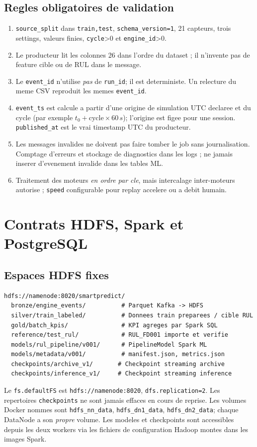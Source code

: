 \documentclass[10pt,a4paper]{article}
\newcommand{\code}[1]{{\small\ttfamily\nolinkurl{#1}}}
\begin{document}
\subsection{Regles obligatoires de validation}
\begin{enumerate}
\item \code{source_split} dans \code{train,test}, \code{schema_version=1}, 21 capteurs, trois settings, valeurs finies, \code{cycle}>0 et \code{engine_id}>0.
\item Le producteur lit les colonnes 26 dans l'ordre du dataset ; il n'invente pas de feature cible ou de RUL dans le message.
\item Le \code{event_id} n'utilise \emph{pas} de \code{run_id}; il est deterministe. Un relecture du meme CSV reproduit les memes \code{event_id}.
\item \code{event_ts} est calcule a partir d'une origine de simulation UTC declaree et du cycle (par exemple \(t_0+\mathrm{cycle}\times 60\,s\)); l'origine est figee pour une session. \code{published_at} est le vrai timestamp UTC du producteur.
\item Les messages invalides ne doivent pas faire tomber le job sans journalisation. Comptage d'erreurs et stockage de diagnostics dans les logs ; ne jamais inserer d'evenement invalide dans les tables ML.
\item Traitement des moteurs \emph{en ordre par cle}, mais intercalage inter-moteurs autorise ; \code{speed} configurable pour replay accelere ou a debit humain.
\end{enumerate}

\section{Contrats HDFS, Spark et PostgreSQL}
\subsection{Espaces HDFS fixes}
\begin{lstlisting}
hdfs://namenode:8020/smartpredict/
  bronze/engine_events/          # Parquet Kafka -> HDFS
  silver/train_labeled/          # Donnees train preparees / cible RUL
  gold/batch_kpis/               # KPI agreges par Spark SQL
  reference/test_rul/            # RUL_FD001 importe et verifie
  models/rul_pipeline/v001/      # PipelineModel Spark ML
  models/metadata/v001/          # manifest.json, metrics.json
  checkpoints/archive_v1/       # Checkpoint streaming archive
  checkpoints/inference_v1/     # Checkpoint streaming inference
\end{lstlisting}
Le \code{fs.defaultFS} est \code{hdfs://namenode:8020}, \code{dfs.replication=2}. Les repertoires \code{checkpoints} ne sont jamais effaces en cours de reprise. Les volumes Docker nommes sont \code{hdfs_nn_data}, \code{hdfs_dn1_data}, \code{hdfs_dn2_data}; chaque DataNode a son \emph{propre} volume. Les modeles et checkpoints sont accessibles depuis les deux workers via les fichiers de configuration Hadoop montes dans les images Spark.
\end{document}
